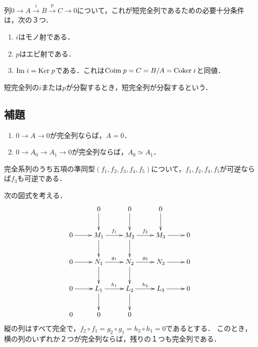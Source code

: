 \documentclass[uplatex,dvipdfmx]{jsreport}
\begin{document}
\begin{proposition}[短完全列であることの特徴付け]
    列$0\to A\xrightarrow{i}B\xrightarrow{p}C\to 0$について，これが短完全列であるための必要十分条件は，次の３つ．
    \begin{enumerate}
        \item $i$はモノ射である．
        \item $p$はエピ射である．
        \item $\mathrm{Im}\; i=\mathrm{Ker}\; p$である．これは$\mathrm{Coim}\; p=C=B/A=\mathrm{Coker}\; i$と同値．
    \end{enumerate}
\end{proposition}

\begin{definition}
    短完全列の$i$または$p$が分裂するとき，短完全列が分裂するという．
\end{definition}

\subsection{補題}

\begin{lemma}\mbox{}
    \begin{enumerate}
        \item $0\to A\to 0$が完全列ならば，$A=0$．
        \item $0\to A_0\to A_1\to 0$が完全列ならば，$A_0\simeq A_1$．
    \end{enumerate}
\end{lemma}

\begin{lemma}
    完全系列のうち五項の準同型$(f_1,f_2,f_3,f_4,f_5)$について，$f_1,f_2,f_4,f_5$が可逆ならば$f_3$も可逆である．
\end{lemma}

\begin{lemma}
    次の図式を考える．
    \[\xymatrix{
            &0\ar[d]&0\ar[d]&0\ar[d]\\
        0\ar[r]&M_1\ar[r]^-{f_1}\ar[d]&M_2\ar[r]^-{f_2}\ar[d]&M_3\ar[r]&0\\
        0\ar[r]&N_1\ar[r]^-{g_1}\ar[d]&N_2\ar[r]^-{g_2}\ar[d]&N_3\ar[r]&0\\
        0\ar[r]&L_1\ar[r]^-{h_1}\ar[d]&L_2\ar[r]^-{h_2}\ar[d]&L_3\ar[r]&0\\
            0&0&0
    }\]
    縦の列はすべて完全で，$f_2\circ f_1=g_2\circ g_1=h_2\circ h_1=0$であるとする．
    このとき，横の列のいずれか２つが完全列ならば，残りの１つも完全列である．
\end{lemma}
\end{document}
